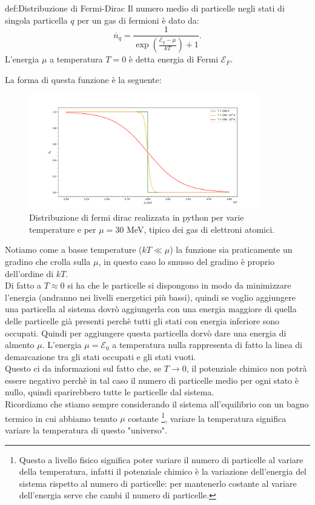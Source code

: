 \begin{defn}{def:Distribuzione di Fermi-Dirac}
	Il numero medio di particelle negli stati di singola particella $q$ per un gas di fermioni è dato da:
	\[
		\overline{n}_{q} = \frac{1}{\exp\left( \frac{\mathcal{E} _{q}-\mu}{kT} \right) +1}
	.\] 
	L'energia $\mu$ a temperatura $T = 0$ è detta energia di Fermi $\mathcal{E}_{F}$.
\end{defn}
La forma di questa funzione è la seguente:
\begin{figure}[H]
	\centering
	\includegraphics[width=0.9\textwidth]{figures/fermi_dirac.png}
	\caption{\scriptsize Distribuzione di fermi dirac realizzata in python per varie temperature e per $\mu = 30$ MeV, tipico dei gas di elettroni atomici.}
	\label{fig:figures-fermi_dirac-png}
\end{figure}
\noindent
Notiamo come a basse temperature ($kT \ll \mu$) la funzione sia praticamente un gradino che crolla sulla $\mu$, in questo caso lo smusso del gradino è proprio dell'ordine di $kT$.\\
Di fatto a $T\approx 0$ si ha che le particelle si dispongono in modo da minimizzare l'energia (andranno nei livelli energetici più bassi), quindi se voglio aggiungere una particella al sistema dovrò aggiungerla con una energia maggiore di quella delle particelle già presenti perchè tutti gli stati con energia inferiore sono occupati. Quindi per aggiungere questa particella dorvò dare una energia di almento $\mu$. L'energia $\mu = \mathcal{E}_{0}$ a temperatura nulla rappresenta di fatto la linea di demarcazione tra gli stati occupati e gli stati vuoti.\\
Questo ci da informazioni sul fatto che, se $T \to 0$, il potenziale chimico non potrà essere negativo perchè in tal caso il numero di particelle medio per ogni stato è nullo, quindi sparirebbero tutte le particelle dal sistema.\\
Ricordiamo che stiamo sempre considerando il sistema all'equilibrio con un bagno termico in cui abbiamo tenuto $\mu $ costante \footnote{Questo a livello fisico significa poter variare il numero di particelle al variare della temperatura, infatti il potenziale chimico è la variazione dell'energia del sistema rispetto al numero di particelle: per mantenerlo costante al variare dell'energia serve che cambi il numero di particelle.}, variare la temperatura significa variare la temperatura di questo "universo".\\
